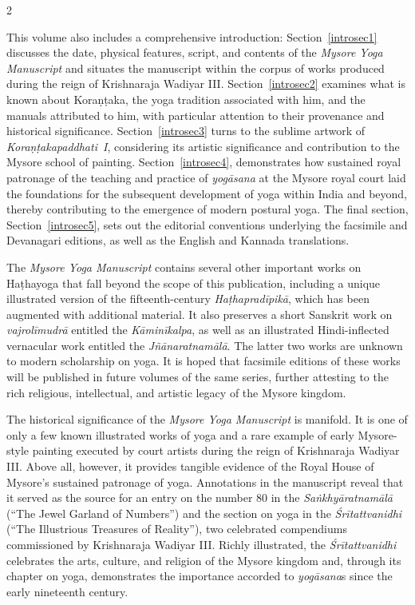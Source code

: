 \begin{nohyp}
\begin{multicols*}{2}
\begin{eng}
This volume also includes a comprehensive introduction: Section~\ref{introsec1} discusses the date, physical features, script, and contents of the \emph{Mysore Yoga Manuscript} and situates the manuscript within the corpus of works produced during the reign of Krishnaraja Wadiyar III. Section~\ref{introsec2} examines what is known about Koraṇṭaka, the yoga tradition associated with him, and the manuals attributed to him, with particular attention to their provenance and historical significance. Section~\ref{introsec3} turns to the sublime artwork of \emph{Koraṇṭakapaddhati}~\emph{I}, considering its artistic significance and contribution to the Mysore school of painting. Section~\ref{introsec4}, demonstrates how sustained royal patronage of the teaching and practice of \emph{yogāsana} at the Mysore royal court laid the foundations for the subsequent development of yoga within India and beyond, thereby contributing to the emergence of modern postural yoga. The final section, Section~\ref{introsec5}, sets out the editorial conventions underlying the facsimile and Devanagari editions, as well as the English and Kannada translations.

The \emph{Mysore Yoga Manuscript} contains several other important works on Haṭhayoga that fall beyond the scope of this publication, including a unique illustrated version of the fifteenth-century \emph{Haṭhapradīpikā}, which has been augmented with additional material. It also preserves a short Sanskrit work on \emph{vajrolīmudrā} entitled the \emph{Kāminīkalpa}, as well as an illustrated Hindi-inflected vernacular work entitled the \emph{Jñānaratnamālā}. The latter two works are unknown to modern scholarship on yoga. It is hoped that facsimile editions of these works will be published in future volumes of the same series, further attesting to the rich religious, intellectual, and artistic legacy of the Mysore kingdom.

The historical significance of the \emph{Mysore Yoga Manuscript} is manifold. It is one of only a few known illustrated works of yoga and a rare example of early Mysore-style painting executed by court artists during the reign of Krishnaraja Wadiyar III. Above all, however, it provides tangible evidence of the Royal House of Mysore's sustained patronage of yoga. Annotations in the manuscript reveal that it served as the source for an entry on the number 80 in the \emph{Saṅkhyāratnamālā} (``The Jewel Garland of Numbers'') and the section on yoga in the \emph{Śrītattvanidhi} (``The Illustrious Treasures of Reality''), two celebrated compendiums commissioned by Krishnaraja Wadiyar III. Richly illustrated, the \emph{Śrītattvanidhi} celebrates the arts, culture, and religion of the Mysore kingdom and, through its chapter on yoga, demonstrates the importance accorded to \emph{yogāsana}s since the early nineteenth century.


\end{eng}
\end{multicols*}
\end{nohyp}
